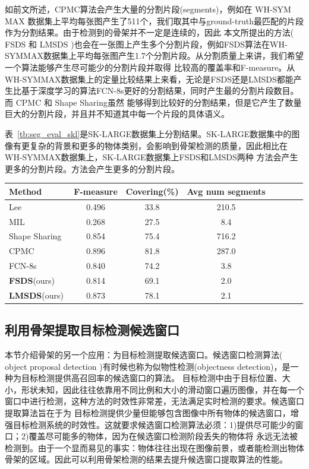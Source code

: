 \documentclass[UTF8]{ctexart}
\numberwithin{equation}{section} %
\numberwithin{table}{section} %
\begin{document}
如前文所述，CPMC算法会产生大量的分割片段(segments)，例如在 WH-SYM\\MAX 数据集上平均每张图产生了511个，我们取其中与ground-truth最匹配的片段作为分割结果。由于检测到的骨架并不一定是连续的，因此
本文所提出的方法( FSDS 和 LMSDS )也会在一张图上产生多个分割片段，例如FSDS算法在WH-SYMMAX数据集上平均每张图产生1.7个分割片段。从分割质量上来讲，我们希望一个算法能够产生尽可能少的分割片段并取得
比较高的覆盖率和F-measure。从WH-SYMMAX数据集上的定量比较结果上来看，无论是FSDS还是LMSDS都能产生比基于深度学习的算法FCN-8s更好的分割结果，同时产生最的分割片段数目。而 CPMC 和 Shape Sharing虽然
能够得到比较好的分割结果，但是它产生了数量巨大的分割片段，并且并不知道其中每一个片段的具体语义。

表~\ref{tb:seg_eval_skl}是SK-LARGE数据集上分割结果。SK-LARGE数据集中的图像有更复杂的背景和更多的物体类别，会影响到骨架检测的质量，因此相比在WH-SYMMAX数据集上，SK-LARGE数据集上FSDS和LMSDS两种
方法会产生更多的分割片段。方法会产生更多的分割片段。
\begin{center}
\begin{tabular}{l*{6}{c}r}
\hline
Method            & F-measure & Covering(\%) & Avg num segments \\
\hline
Lee~\cite{sie2013detecting}         & 0.496 & 33.8 & 210.5 \\
MIL~\cite{tsogkas2012learning}      & 0.268 & 27.5 & 8.4   \\
Shape Sharing~\cite{kim2012shape}   & 0.854 & 75.4 & 716.2 \\
CPMC~\cite{carreira2010constrained} & 0.896 & 81.8 & 287.0 \\
FCN-8s~\cite{long2015fully}         & 0.840 & 74.2 & 3.8   \\
\textbf{FSDS}(ours)                 & 0.814 & 69.1 & 2.0   \\
\textbf{LMSDS}(ours)                & 0.873 & 78.1 & 2.1   \\
\hline
\end{tabular}
\label{tb:seg_eval_skl}
\end{center}

\subsection{利用骨架提取目标检测候选窗口}
本节介绍骨架的另一个应用：为目标检测提取候选窗口。候选窗口检测算法( object proposal detection )有时候也称为似物性检测(objectness detection)，是一种为目标检测提供高召回率的候选窗口的算法。
目标检测中由于目标位置、大小，形状未知，因此往往依靠用不同比例和大小的滑动窗口遍历图像，并在每一个窗口中进行检测，这种方法的时效性非常差，无法满足实时检测的要求。候选窗口提取算法旨在于为
目标检测提供少量但能够包含图像中所有物体的候选窗口，增强目标检测系统的时效性。这就要求候选窗口检测算法必须：1)提供尽可能少的窗口；2)覆盖尽可能多的物体，因为在候选窗口检测阶段丢失的物体将
永远无法被检测到。由于一个显而易见的事实：物体往往出现在图像前景，或者能检测出物体骨架的区域。因此可以利用骨架检测的结果去提升候选窗口提取算法的性能。
\end{document}
